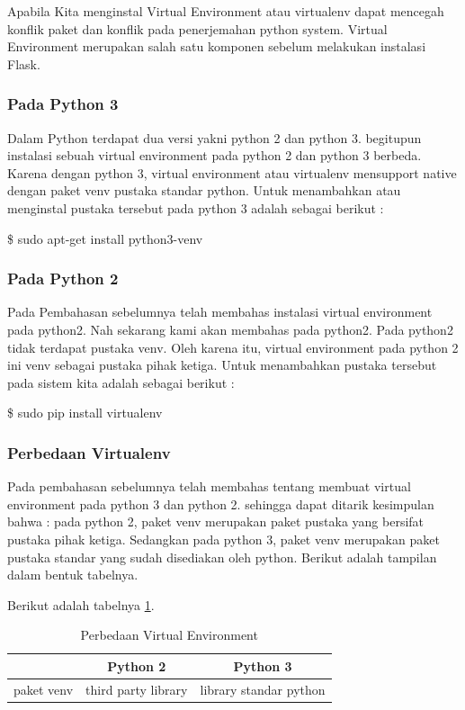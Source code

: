 \documentclass[12pt,a4paper]{article}
\begin{document}
Apabila Kita menginstal Virtual Environment atau virtualenv dapat mencegah konflik paket dan konflik pada penerjemahan python system. Virtual Environment merupakan salah satu komponen sebelum melakukan instalasi Flask.
\subsubsection{Pada Python 3}
Dalam Python terdapat dua versi yakni python 2 dan python 3. begitupun instalasi sebuah virtual environment pada python 2 dan python 3 berbeda. Karena dengan python 3, virtual environment atau virtualenv mensupport native dengan paket venv pustaka standar python. Untuk menambahkan atau menginstal pustaka tersebut pada python 3 adalah sebagai berikut :

\$ sudo apt-get install python3-venv
\subsubsection{Pada Python 2}
Pada Pembahasan sebelumnya telah membahas instalasi virtual environment pada python2. Nah sekarang kami akan membahas pada python2. Pada python2 tidak terdapat pustaka venv. Oleh karena itu, virtual environment pada python 2 ini venv sebagai pustaka pihak ketiga.
Untuk menambahkan pustaka tersebut pada sistem kita adalah sebagai berikut :

\$ sudo pip install virtualenv
\subsubsection{Perbedaan Virtualenv}
Pada pembahasan sebelumnya telah membahas tentang membuat virtual environment pada python 3 dan python 2. sehingga dapat ditarik kesimpulan bahwa :
pada python 2, paket venv merupakan paket pustaka yang bersifat pustaka pihak ketiga. Sedangkan pada python 3, paket venv merupakan paket pustaka standar yang sudah disediakan oleh python.
Berikut adalah tampilan dalam bentuk tabelnya.

Berikut adalah tabelnya \ref{table:perbedaan1}.
\begin{table}[h]
\caption{Perbedaan Virtual Environment}

\centering
\begin{tabular}{ccc}
\hline
&Python 2&Python 3\\
\hline
paket venv&third party library&library standar python\\
\hline
\end{tabular}
\label{table:perbedaan1}
\end{table}
\end{document}
